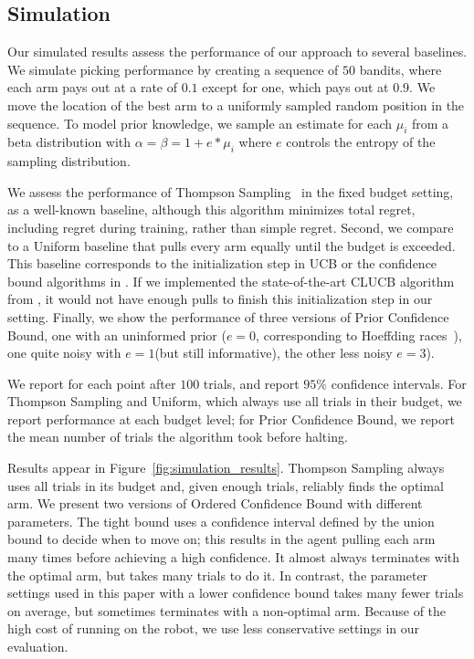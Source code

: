 \documentclass{article}
\newcommand{\algorithmCTxt}{Ordered Confidence Bound\xspace}
\newcommand{\algorithmDTxt}{Prior Confidence Bound\xspace}
\begin{document}
\subsection{Simulation}

Our simulated results assess the performance of our approach to
several baselines.  We simulate picking performance by creating a
sequence of $50$ bandits, where each arm pays out at a rate of $0.1$
except for one, which pays out at $0.9$.  We move the location of the
best arm to a uniformly sampled random position in the sequence.  To
model prior knowledge, we sample an estimate for each $\mu_i$ from a
beta distribution with $\alpha = \beta = 1 + e * \mu_i$ where $e$
controls the entropy of the sampling distribution.


We assess the performance of Thompson Sampling~\citep{thompson33} in
the fixed budget setting, as a well-known baseline, although this
algorithm minimizes total regret, including regret during training,
rather than simple regret.  Second, we compare to a Uniform baseline
that pulls every arm equally until the budget is exceeded.  This
baseline corresponds to the initialization step in UCB or the
confidence bound algorithms in \citet{chen14}.  If we implemented the
state-of-the-art CLUCB algorithm from \citet{chen14}, it would not
have enough pulls to finish this initialization step in our setting.
Finally, we show the performance of three versions of \algorithmDTxt,
one with an uninformed prior ($e=0$, corresponding to Hoeffding
races~\citep{maron93}), one quite noisy with $e=1$(but still
informative), the other less noisy $e=3$).

We report for each point after $100$ trials, and report $95\%$
confidence intervals.  For Thompson Sampling and Uniform, which always
use all trials in their budget, we report performance at each budget
level; for \algorithmDTxt, we report the mean number of trials the
algorithm took before halting.

Results appear in Figure~\ref{fig:simulation_results}.  Thompson
Sampling always uses all trials in its budget and, given enough
trials, reliably finds the optimal arm.  We present two versions of
\algorithmCTxt with different parameters.  The tight bound uses a
confidence interval defined by the union bound to decide when to move
on; this results in the agent pulling each arm many times before
achieving a high confidence.  It almost always terminates with the
optimal arm, but takes many trials to do it.  In contrast, the
parameter settings used in this paper with a lower confidence bound
takes many fewer trials on average, but sometimes terminates with a
non-optimal arm.  Because of the high cost of running on the robot, we
use less conservative settings in our evaluation.
\end{document}
